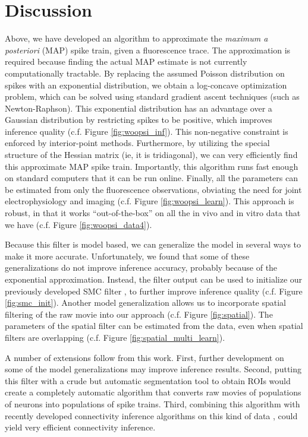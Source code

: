 \section{Discussion} \label{sec:dis}


Above, we have developed an algorithm to approximate the \emph{maximum a posteriori} (MAP) spike train, given a fluorescence trace.  The approximation is required because finding the actual MAP estimate is not currently computationally tractable.  By replacing the assumed Poisson distribution on spikes with an exponential distribution, we obtain a log-concave optimization problem, which can be solved using standard gradient ascent techniques (such as Newton-Raphson).  This exponential distribution has an advantage over a Gaussian distribution by restricting spikes to be positive, which improves inference quality (c.f. Figure \ref{fig:woopsi_inf}).  This non-negative constraint is enforced by interior-point methods.  Furthermore, by utilizing the special structure of the Hessian matrix (ie, it is tridiagonal), we can very efficiently find this approximate MAP spike train.  Importantly, this algorithm runs fast enough on standard computers that it can be run online.  Finally, all the parameters can be estimated from only the fluorescence observations, obviating the need for joint electrophysiology and imaging (c.f. Figure \ref{fig:woopsi_learn}).  This approach is robust, in that it works ``out-of-the-box'' on all the in vivo and in vitro data that we have (c.f. Figure \ref{fig:woopsi_data4}).

Because this filter is model based, we can generalize the model in several ways to make it more accurate.  Unfortunately, we found that some of these generalizations do not improve inference accuracy, probably because of the exponential approximation.  Instead, the \foopsi filter output can be used to initialize our previously developed SMC filter \cite{VogelsteinPaninski09}, to further improve inference quality (c.f. Figure \ref{fig:smc_init}).  Another model generalization allows us to incorporate spatial filtering of the raw movie into our approach (c.f. Figure \ref{fig:spatial}).  The parameters of the spatial filter can be estimated from the data, even when spatial filters are overlapping (c.f. Figure \ref{fig:spatial_multi_learn}).

A number of extensions follow from this work.  First, further development on some of the model generalizations may improve inference results. Second, putting this filter with a crude but automatic segmentation tool to obtain ROIs would create a completely automatic algorithm that converts raw movies of populations of neurons into populations of spike trains.  Third, combining this algorithm with recently developed connectivity inference algorithms on this kind of data \cite{MishchenkoPaninski09}, could yield very efficient connectivity inference.